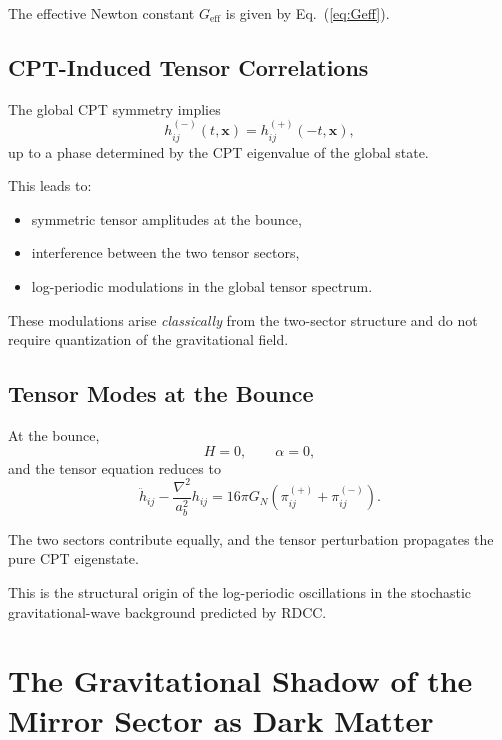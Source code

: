 \documentclass[11pt,a4paper]{article}
\begin{document}
The effective Newton constant $G_{\mathrm{eff}}$ is given by Eq.~(\ref{eq:Geff}).

\subsection{CPT-Induced Tensor Correlations}

The global CPT symmetry implies
\begin{equation}
h_{ij}^{(-)}(t,\mathbf{x}) = h_{ij}^{(+)}(-t,\mathbf{x}),
\end{equation}
up to a phase determined by the CPT eigenvalue of the global state.

This leads to:

\begin{itemize}
\item symmetric tensor amplitudes at the bounce,
\item interference between the two tensor sectors,
\item log-periodic modulations in the global tensor spectrum.
\end{itemize}

These modulations arise \emph{classically} from the two-sector structure and do not require quantization of the gravitational field.

\subsection{Tensor Modes at the Bounce}

At the bounce,
\begin{equation}
H = 0, \qquad \alpha = 0,
\end{equation}
and the tensor equation reduces to
\begin{equation}
\ddot{h}_{ij} - \frac{\nabla^2}{a_b^2} h_{ij}
= 16\pi G_N \left( \pi_{ij}^{(+)} + \pi_{ij}^{(-)} \right).
\end{equation}

The two sectors contribute equally, and the tensor perturbation propagates the pure CPT eigenstate.

This is the structural origin of the log-periodic oscillations in the stochastic gravitational-wave background predicted by RDCC.

\section{The Gravitational Shadow of the Mirror Sector as Dark Matter}
\end{document}
